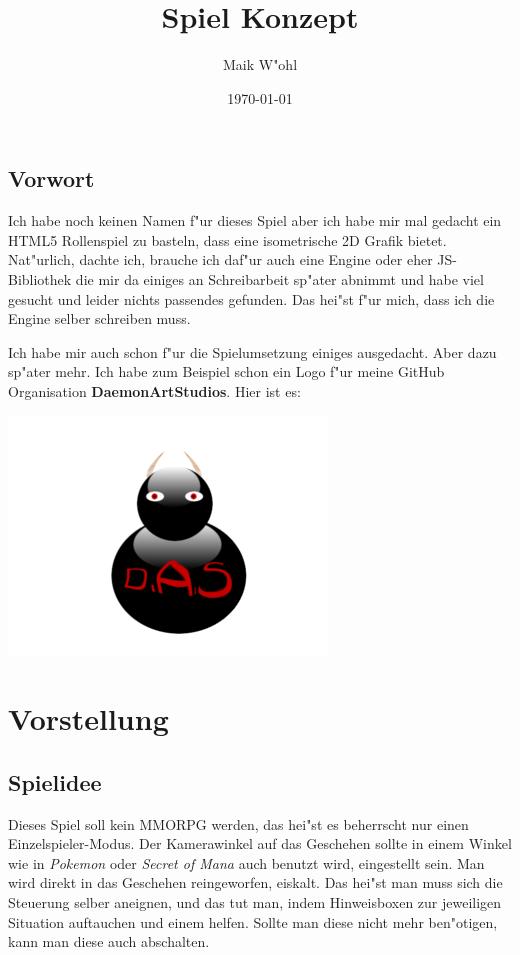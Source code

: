 \documentclass[14pt]{book}
\title{Spiel Konzept}
\author{Maik W"ohl}
\date{\today}
\begin{document}
\maketitle

\tableofcontents

\chapter*{Vorwort}

Ich habe noch keinen Namen f"ur dieses Spiel aber ich habe mir mal gedacht ein HTML5 Rollenspiel zu basteln, dass eine isometrische 2D Grafik bietet. Nat"urlich, dachte ich, brauche ich daf"ur auch eine Engine oder eher JS-Bibliothek die mir da einiges an Schreibarbeit sp"ater abnimmt und habe viel gesucht und leider nichts passendes gefunden. Das hei"st f"ur mich, dass ich die Engine selber schreiben muss.

Ich habe mir auch schon f"ur die Spielumsetzung einiges ausgedacht. Aber dazu sp"ater mehr. Ich habe zum Beispiel schon ein Logo f"ur meine GitHub Organisation \textbf{DaemonArtStudios}. Hier ist es:

\includegraphics{logo-das-small}

\part{Vorstellung}

\chapter{Spielidee}

Dieses Spiel soll kein MMORPG werden, das hei"st es beherrscht nur einen Einzelspieler-Modus. Der Kamerawinkel auf das Geschehen sollte in einem Winkel wie in \emph{Pokemon} oder \emph{Secret of Mana} auch benutzt wird, eingestellt sein. Man wird direkt in das Geschehen reingeworfen, eiskalt. Das hei"st man muss sich die Steuerung selber aneignen, und das tut man, indem Hinweisboxen zur jeweiligen Situation auftauchen und einem helfen. Sollte man diese nicht mehr ben"otigen, kann man diese auch abschalten.
\end{document}
